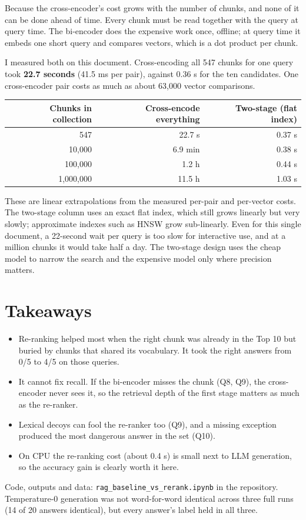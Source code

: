 \documentclass[10pt,a4paper]{article}
\begin{document}
Because the cross-encoder's cost grows with the number of chunks, and none of it can be done
ahead of time. Every chunk must be read together with the query at query time. The
bi-encoder does the expensive work once, offline; at query time it embeds one short query
and compares vectors, which is a dot product per chunk.

I measured both on this document. Cross-encoding all 547 chunks for one query took
\textbf{22.7 seconds} (41.5 ms per pair), against 0.36 s for the ten candidates. One
cross-encoder pair costs as much as about 63,000 vector comparisons.

\begin{center}\small
\begin{tabular}{rrr}
\toprule
Chunks in collection & Cross-encode everything & Two-stage (flat index) \\
\midrule
547 & 22.7 s & 0.37 s \\
10,000 & 6.9 min & 0.38 s \\
100,000 & 1.2 h & 0.44 s \\
1,000,000 & 11.5 h & 1.03 s \\
\bottomrule
\end{tabular}
\end{center}

These are linear extrapolations from the measured per-pair and per-vector costs. The
two-stage column uses an exact flat index, which still grows linearly but very slowly;
approximate indexes such as HNSW grow sub-linearly. Even for this single document, a
22-second wait per query is too slow for interactive use, and at a million chunks it would
take half a day. The two-stage design uses the cheap model to narrow the search and the
expensive model only where precision matters.

\section*{Takeaways}
\begin{itemize}
\item Re-ranking helped most when the right chunk was already in the Top 10 but buried by
chunks that shared its vocabulary. It took the right answers from 0/5 to 4/5 on those queries.
\item It cannot fix recall. If the bi-encoder misses the chunk (Q8, Q9), the cross-encoder
never sees it, so the retrieval depth of the first stage matters as much as the re-ranker.
\item Lexical decoys can fool the re-ranker too (Q9), and a missing exception produced the
most dangerous answer in the set (Q10).
\item On CPU the re-ranking cost (about 0.4 s) is small next to LLM generation, so the
accuracy gain is clearly worth it here.
\end{itemize}

\vspace{0.2cm}
\noindent\small Code, outputs and data: \texttt{rag\_baseline\_vs\_rerank.ipynb} in the
repository. Temperature-0 generation was not word-for-word identical across three full runs
(14 of 20 answers identical), but every answer's label held in all three.
\end{document}
